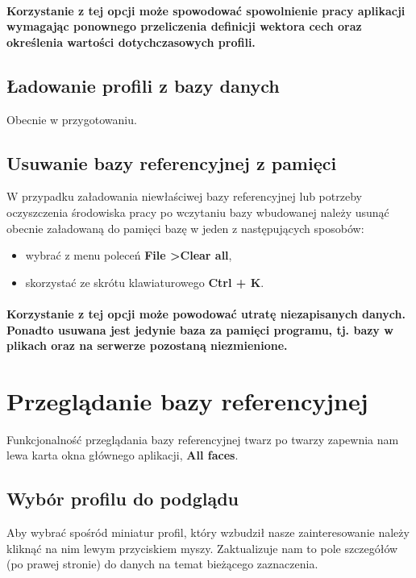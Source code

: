 \documentclass[]{article}
\begin{document}
\paragraph*{Korzystanie z tej opcji może spowodować spowolnienie pracy aplikacji wymagając ponownego przeliczenia definicji wektora cech oraz określenia wartości dotychczasowych profili.}

\subsection{Ładowanie profili z bazy danych}
Obecnie w przygotowaniu.

\subsection{Usuwanie bazy referencyjnej z pamięci}
W przypadku załadowania niewłaściwej bazy referencyjnej lub potrzeby oczyszczenia środowiska pracy po wczytaniu bazy wbudowanej należy usunąć obecnie załadowaną do pamięci bazę w jeden z następujących sposobów:
\begin{itemize}
	\item wybrać z menu poleceń \textbf{File \textgreater \space Clear all},
	\item skorzystać ze skrótu klawiaturowego \textbf{Ctrl + K}.
\end{itemize}
\paragraph*{Korzystanie z tej opcji może powodować utratę niezapisanych danych. Ponadto usuwana jest jedynie baza za pamięci programu, tj. bazy w plikach oraz na serwerze pozostaną niezmienione.}




\section[Przeglądanie bazy]{Przeglądanie bazy referencyjnej}
\label{sec:view}
Funkcjonalność przeglądania bazy referencyjnej twarz po twarzy zapewnia nam lewa karta okna głównego aplikacji, \textbf{All faces}.

\subsection{Wybór profilu do podglądu}
Aby wybrać spośród miniatur profil, który wzbudził nasze zainteresowanie należy kliknąć na nim lewym przyciskiem myszy. Zaktualizuje nam to pole szczegółów (po prawej stronie) do danych na temat bieżącego zaznaczenia.
\end{document}
